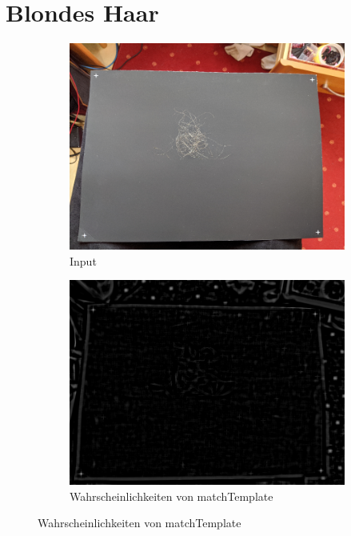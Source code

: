 \documentclass[german,a4paper, 12pt]{llncs}
\begin{document}
\section{Blondes Haar}

\begin{figure}[H] %
	\begin{subfigure}{0.48\textwidth}
		\includegraphics[width=\linewidth]{figBina/01foundDots.png}
		\caption{Input} \label{fig:a}
	\end{subfigure}\hspace*{\fill}
	\begin{subfigure}{0.48\textwidth}
		\includegraphics[width=\linewidth]{figBina/02revRes.png}
		\caption{Wahrscheinlichkeiten von matchTemplate} \label{fig:b}
	\end{subfigure}
	

\end{figure}
\end{document}
